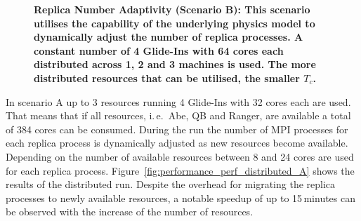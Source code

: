 \documentclass{rspublic}
\newcommand{\alnote}[1]{ {\textcolor{blue} { ***AL: #1 }}}
\newcommand{\jhanote}[1]{ {\textcolor{red} { ***SJ: #1 }}}
\newcommand{\alnote}[1]{}
\newcommand{\jhanote}[1]{}
\begin{document}
{\begin{figure}[h]
\begin{minipage}[t]{.485\textwidth}
\begin{center}
      \caption{\footnotesize \bf Replica Number Adaptivity (Scenario B):  
      This scenario utilises the capability of the underlying physics model 
      to dynamically adjust the number of replica processes. 
      A constant number of 4 Glide-Ins with 64 cores each 
      distributed across 1, 2 and 3 machines is  used. 
      The more distributed resources that can be utilised, the smaller $T_{c}$.}
      \label{fig:performance_perf_distributed_B}
    \end{center}
  \end{minipage}
  \hfill
\end{figure}

                     
In scenario A up to 3 resources running 4 Glide-Ins with 32 cores each are used. 
That means that if all resources, i.\,e.\ Abe, QB and Ranger, are available
a total of 384 cores can be consumed. 
During the run the number of MPI processes for each replica process is 
dynamically adjusted  as new resources 
become available. Depending on the number of available resources between
8 and 24 cores are used for each replica process.
Figure~\ref{fig:performance_perf_distributed_A} shows the results of the distributed
run. Despite the overhead for migrating the replica processes to newly available
resources, a notable speedup of up to 15\,minutes can be observed with the increase of 
the number of resources.

}
\end{document}
